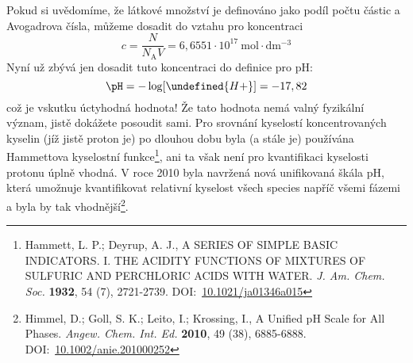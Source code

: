 \documentclass{book}
\let\ch\undefined
\begin{document}
Pokud si uvědomíme, že látkové množství je definováno jako podíl počtu
částic a Avogadrova čísla, můžeme dosadit do vztahu pro koncentraci
\[
c=\frac{N}{N_{\mathrm{A}}V}=6,6551\cdot10^{17}\mathrm{~mol\cdot dm^{-3}}
\]
Nyní už zbývá jen dosadit tuto koncentraci do definice pro pH: 
\[
\pH=-\log[\ch{H+}]=-17,82
\]
což je vskutku úctyhodná hodnota! Že tato hodnota nemá valný
fyzikální význam, jistě dokážete posoudit sami. Pro srovnání kyselostí
koncentrovaných kyselin (jíž jistě proton je) po dlouhou dobu byla
(a stále je) používána Hammettova kyselostní funkce\footnote{Hammett, L. P.; Deyrup, A. J., A SERIES OF SIMPLE BASIC INDICATORS. I. THE ACIDITY FUNCTIONS OF MIXTURES OF SULFURIC AND PERCHLORIC ACIDS WITH WATER. \textit{J. Am. Chem. Soc.} \textbf{1932}, 54 (7), 2721-2739. DOI:~\href{https://doi.org/10.1021/ja01346a015}{\underline{10.1021/ja01346a015}}}, ani ta však není pro kvantifikaci kyselosti protonu úplně vhodná.
V roce 2010 byla navržená nová unifikovaná škála pH, která umožnuje
kvantifikovat relativní kyselost všech species napříč všemi fázemi
a byla by tak vhodnější\footnote{Himmel, D.; Goll, S. K.; Leito, I.; Krossing, I.,
A Unified pH Scale for All Phases. \textit{Angew. Chem. Int. Ed.} \textbf{2010}, 49 (38), 6885-6888. DOI:~\href{https://onlinelibrary.wiley.com/doi/abs/10.1002/anie.201000252}{\underline{10.1002/anie.201000252}}}.
\end{document}
